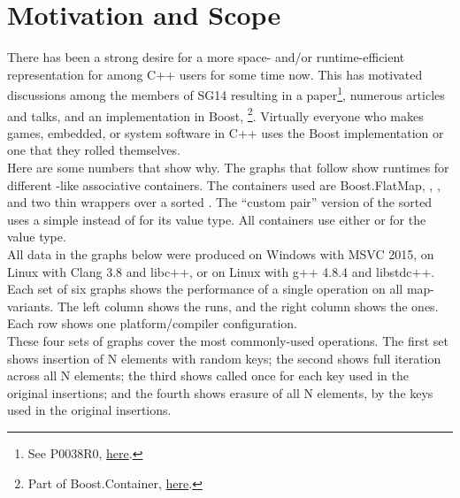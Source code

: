 \section{Motivation and Scope}

There has been a strong desire for a more space- and/or runtime-efficient
representation for  among C++ users for some time now.  This has
motivated discussions among the members of SG14 resulting in a
paper\footnote{See P0038R0,
  \href{http://www.open-std.org/jtc1/sc22/wg21/docs/papers/2015/p0038r0.html}{here}.},
numerous articles and talks, and an implementation in Boost,
\footnote{Part of Boost.Container,
  \href{http://www.boost.org/doc/libs/1_61_0/doc/html/container.html}{here}.}.
Virtually everyone who makes games, embedded, or system software in C++ uses
the Boost implementation or one that they rolled themselves.\\

Here are some numbers that show why.  The graphs that follow show runtimes for
different -like associative containers.  The containers used are
Boost.FlatMap, , , and two thin wrappers over a
sorted .  The ``custom pair'' version of the sorted 
uses a simple  instead of  for its value type.  All
containers use either  or 
for the value type.\\

All data in the graphs below were produced on Windows with MSVC 2015, on Linux
with Clang 3.8 and libc++, or on Linux with g++ 4.8.4 and libstdc++.\\

Each set of six graphs shows the performance of a single operation on all
map-variants.  The left column shows the  runs, and the right
column shows the  ones.  Each row shows one
platform/compiler configuration. \\

These four sets of graphs cover the most commonly-used operations.  The first
set shows insertion of N elements with random keys; the second shows full
iteration across all N elements; the third shows  called once
for each key used in the original insertions; and the fourth shows erasure of
all N elements, by the keys used in the original insertions.

